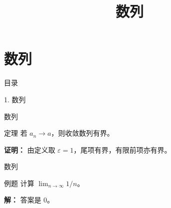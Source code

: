 \documentclass[aspectratio=169,10pt,fontset=fandol]{ctexbeamer}
\title{数列}
\begin{document}
\section{数列}
\begin{frame}[t,fragile]{目录}
\normalsize
{\color{blue}\normalsize 1. 数列\par}\vspace{0.3em}
\end{frame}
\begin{frame}[t,fragile]{数列}
\normalsize
\begin{block}{定理}
{\normalsize
若 $a_n\to a$，则收敛数列有界。
}
\end{block}
\pause
{\normalsize
\textbf{证明：}
由定义取 $\varepsilon=1$，尾项有界，有限前项亦有界。
}
\end{frame}
\begin{frame}[t,fragile]{数列}
\normalsize
\begin{block}{例题}
{\normalsize
计算 $\lim_{n\to\infty}1/n$。
}
\end{block}
\pause
{\normalsize
\textbf{解：}
答案是 $0$。
}
\end{frame}
\end{document}
